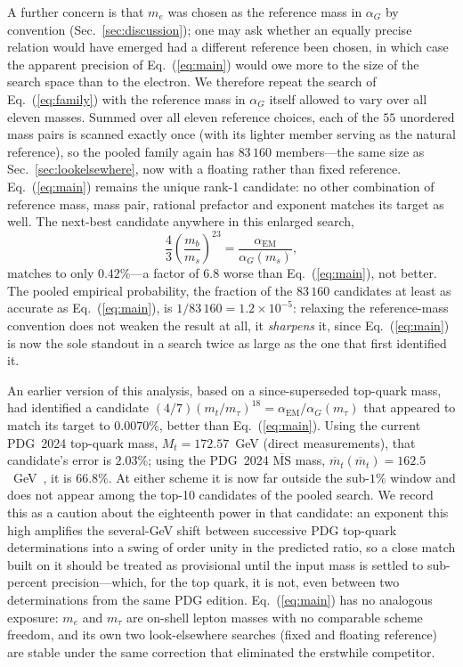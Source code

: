 \documentclass[aps,prd,twocolumn,amsmath,amssymb,floatfix,nofootinbib]{revtex4-2}
\begin{document}
A further concern is that $m_e$ was chosen as the reference mass in
$\alpha_G$ by convention (Sec.~\ref{sec:discussion}); one may ask whether an
equally precise relation would have emerged had a different reference been
chosen, in which case the apparent precision of Eq.~(\ref{eq:main}) would owe
more to the size of the search space than to the electron. We therefore
repeat the search of Eq.~(\ref{eq:family}) with the reference mass in
$\alpha_G$ itself allowed to vary over all eleven masses. Summed over all
eleven reference choices, each of the $55$ unordered mass pairs is scanned
exactly once (with its lighter member serving as the natural reference), so
the pooled family again has $83\,160$ members---the same size as
Sec.~\ref{sec:lookelsewhere}, now with a floating rather than fixed
reference. Eq.~(\ref{eq:main}) remains the unique rank-1 candidate: no other
combination of reference mass, mass pair, rational prefactor and exponent
matches its target as well. The next-best candidate anywhere in this enlarged
search,
\begin{equation}
\frac{4}{3}\left(\frac{m_b}{m_s}\right)^{\!23}
= \frac{\alpha_{\mathrm{EM}}}{\alpha_G(m_s)},
\end{equation}
matches to only $0.42\%$---a factor of $6.8$ worse than Eq.~(\ref{eq:main}),
not better. The pooled empirical probability, the fraction of the $83\,160$
candidates at least as accurate as Eq.~(\ref{eq:main}), is $1/83\,160
=1.2\times 10^{-5}$: relaxing the reference-mass convention does not weaken
the result at all, it \emph{sharpens} it, since Eq.~(\ref{eq:main}) is now the
sole standout in a search twice as large as the one that first identified it.

An earlier version of this analysis, based on a since-superseded top-quark
mass, had identified a candidate
$(4/7)(m_t/m_\tau)^{18}=\alpha_{\mathrm{EM}}/\alpha_G(m_\tau)$ that appeared to
match its target to $0.0070\%$, better than Eq.~(\ref{eq:main}). Using the
current PDG~2024 top-quark mass, $M_t=172.57$~GeV (direct measurements), that
candidate's error is $2.03\%$; using the PDG~2024 $\overline{\mathrm{MS}}$
mass, $\overline{m}_t(\overline{m}_t)=162.5$~GeV~\cite{pdg2024}, it is
$66.8\%$. At either scheme it is now far outside the sub-$1\%$ window and does
not appear among the top-10 candidates of the pooled search. We record this
as a caution about the eighteenth power in that candidate: an exponent this
high amplifies the several-GeV shift between successive PDG top-quark
determinations into a swing of order unity in the predicted ratio, so a
close match built on it should be treated as provisional until the input mass
is settled to sub-percent precision---which, for the top quark, it is not,
even between two determinations from the same PDG edition. Eq.~(\ref{eq:main})
has no analogous exposure: $m_e$ and $m_\tau$ are on-shell lepton masses with
no comparable scheme freedom, and its own two look-elsewhere searches (fixed
and floating reference) are stable under the same correction that eliminated
the erstwhile competitor.
\end{document}
